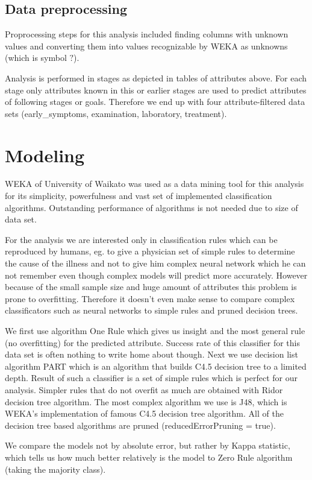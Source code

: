 \documentclass[11pt]{article}
\begin{document}
\subsection{Data preprocessing}
Proprocessing steps for this analysis included finding columns with unknown
values and converting them into values recognizable by WEKA as unknowns (which
is symbol $?$).

Analysis is performed in stages as depicted in tables of attributes above.  For
each stage only attributes known in this or earlier stages are used to predict
attributes of following stages or goals. Therefore we end up with four
attribute-filtered data sets (early\_symptoms, examination, laboratory, treatment).

\section{Modeling}
WEKA of University of Waikato was used as a data mining tool for this analysis
for its simplicity, powerfulness and vast set of implemented classification
algorithms. Outstanding performance of algorithms is not needed due to size of
data set.

For the analysis we are interested only in classification rules which can be
reproduced by humans, eg.  to give a physician set of simple rules to determine
the cause of the illness and not to give him complex neural network which he
can not remember even though complex models will predict more accurately.
However because of the small sample size and huge amount of attributes this
problem is prone to overfitting. Therefore it doesn't even make sense to
compare complex classificators such as neural networks to simple rules and
pruned decision trees.

We first use algorithm One Rule which gives us insight and the most general
rule (no overfitting) for the predicted attribute. Success rate of this
classifier for this data set is often nothing to write home about though.  Next
we use decision list algorithm PART\cite{Frank1998} which is an algorithm that
builds C4.5 decision tree to a limited depth. Result of such a classifier is a
set of simple rules which is perfect for our analysis.  Simpler rules that do
not overfit as much are obtained with Ridor decision tree algorithm. The most
complex algorithm we use is J48, which is WEKA's implementation of famous C4.5
decision tree algorithm. All of the decision tree based algorithms are pruned
(reducedErrorPruning = true).

We compare the models not by absolute error, but rather by Kappa statistic,
which tells us how much better relatively is the model to Zero Rule algorithm
(taking the majority class).
\end{document}
